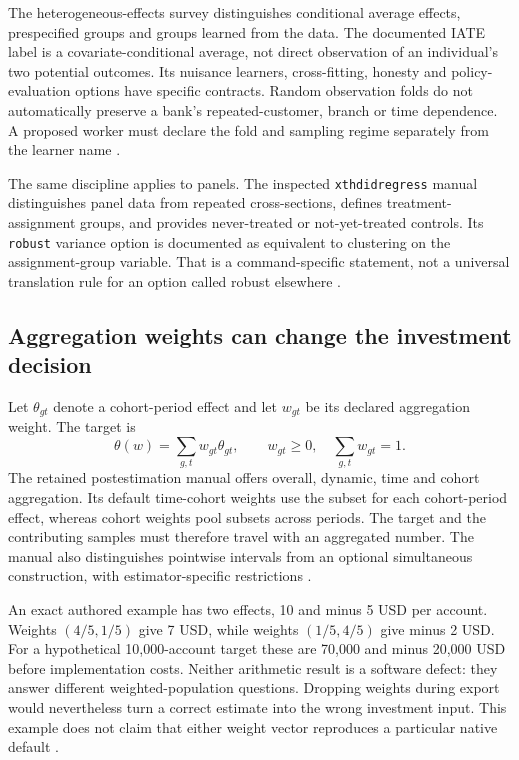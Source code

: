 The heterogeneous-effects survey distinguishes conditional average effects,
prespecified groups and groups learned from the data. The documented IATE
label is a covariate-conditional average, not direct observation of an
individual's two potential outcomes. Its nuisance learners, cross-fitting,
honesty and policy-evaluation options have specific contracts. Random
observation folds do not automatically preserve a bank's repeated-customer,
branch or time dependence. A proposed worker must declare the fold and
sampling regime separately from the learner name
\citep{exec13_ch_stata,exec24_stata_choice}.

The same discipline applies to panels. The inspected
\texttt{xthdidregress} manual distinguishes panel data from repeated
cross-sections, defines treatment-assignment groups, and provides
never-treated or not-yet-treated controls. Its \texttt{robust} variance
option is documented as equivalent to clustering on the assignment-group
variable. That is a command-specific statement, not a universal translation
rule for an option called robust elsewhere
\citep{exec18_gp_stata_xthdid}.

\subsection{Aggregation weights can change the investment decision}
Let $\theta_{gt}$ denote a cohort-period effect and let $w_{gt}$ be its
declared aggregation weight. The target is
\[
 \theta(w)=\sum_{g,t} w_{gt}\theta_{gt},\qquad
 w_{gt}\geq0,\quad\sum_{g,t}w_{gt}=1.
\]
The retained postestimation manual offers overall, dynamic, time and cohort
aggregation. Its default time-cohort weights use the subset for each
cohort-period effect, whereas cohort weights pool subsets across periods.
The target and the contributing samples must therefore travel with an
aggregated number. The manual also distinguishes pointwise intervals from
an optional simultaneous construction, with estimator-specific restrictions
\citep{exec18_gp_stata_post}.

An exact authored example has two effects, 10 and minus 5 USD per account.
Weights $(4/5,1/5)$ give 7 USD, while weights $(1/5,4/5)$ give minus
2 USD. For a hypothetical 10,000-account target these are 70,000 and minus
20,000 USD before implementation costs. Neither arithmetic result is a
software defect: they answer different weighted-population questions.
Dropping weights during export would nevertheless turn a correct estimate
into the wrong investment input. This example does not claim that either
weight vector reproduces a particular native default
\citep{exec24_stata_choice}.

